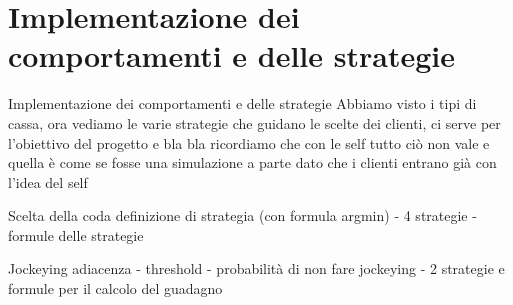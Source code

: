 \section{Implementazione dei comportamenti e delle strategie}
\begin{frame}{Implementazione dei comportamenti e delle strategie}
	\centering
	Abbiamo visto i tipi di cassa, ora vediamo le varie strategie che guidano le scelte dei clienti, ci serve per l'obiettivo del progetto e bla bla
	ricordiamo che con le self tutto ciò non vale e quella è come se fosse una simulazione a parte dato che i clienti entrano già con l'idea del self
\end{frame}

\begin{frame}{Scelta della coda}
	\centering
	definizione di strategia (con formula argmin) - 4 strategie - formule delle strategie
\end{frame}

\begin{frame}{Jockeying}
	\centering
	adiacenza - threshold - probabilità di non fare jockeying - 2 strategie e formule per il calcolo del guadagno
\end{frame}